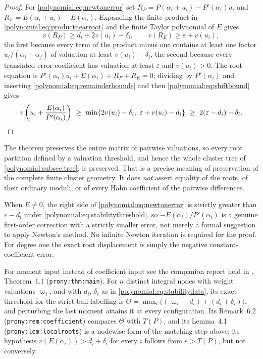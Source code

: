 \documentclass[11pt,letterpaper]{article}
\numberwithin{equation}{section}
\theoremstyle{definition}
\theoremstyle{remark}\newtheorem{remark}[theorem]{Remark}
\begin{document}
\begin{proof}
For \eqref{polynomial:eq:newtonerror} set
$R_P=P(\alpha_i+u_i)-P'(\alpha_i)u_i$ and $R_E=E(\alpha_i+u_i)-E(\alpha_i)$.
Expanding the finite product in \eqref{polynomial:eq:productnearroot} and the
finite Taylor polynomial of $E$ gives
\begin{equation}\label{polynomial:eq:remainderbounds}
 v(R_P)\ge d_i+2v(u_i)-\delta_i,\qquad v(R_E)\ge\varepsilon+v(u_i),
\end{equation}
the first because every term of the product minus one contains at least one
factor $u_i/(\alpha_i-\alpha_j)$ of valuation at least $v(u_i)-\delta_i$, the
second because every translated error coefficient has valuation at least
$\varepsilon$ and $v(u_i)>0$. The root equation is
$P'(\alpha_i)u_i+E(\alpha_i)+R_P+R_E=0$; dividing by $P'(\alpha_i)$ and
inserting \eqref{polynomial:eq:remainderbounds} and then
\eqref{polynomial:eq:shiftbound} gives
\[
 v\left(u_i+\frac{E(\alpha_i)}{P'(\alpha_i)}\right)
 \ \ge\ \min\{2v(u_i)-\delta_i,\ \varepsilon+v(u_i)-d_i\}
 \ \ge\ 2(\varepsilon-d_i)-\delta_i . \qedhere
\]
\end{proof}

The theorem preserves the entire matrix of pairwise valuations, so every root
partition defined by a valuation threshold, and hence the whole cluster tree
of \cref{polynomial:subsec:tree}, is preserved. That is a precise meaning of
preservation of the complete finite cluster geometry. It does \emph{not}
assert equality of the roots, of their ordinary moduli, or of every Hahn
coefficient of the pairwise differences.

When $E\ne0$, the right side of \eqref{polynomial:eq:newtonerror} is strictly greater than
$\varepsilon-d_i$ under \eqref{polynomial:eq:stabilitythreshold}, so
$-E(\alpha_i)/P'(\alpha_i)$ is a genuine first-order correction with a
strictly smaller error, not merely a formal suggestion to apply Newton's
method. No infinite Newton iteration is required for the proof. For degree one
the exact root displacement is simply the negative constant-coefficient error.

For moment input instead of coefficient input see the companion report held in
, Theorem~1.1
(\texttt{prony:thm:main}). For $n$ distinct integral nodes with weight
valuations $\varpi_i$, and with $d_i$, $\delta_i$ as in
\eqref{polynomial:eq:stabilitydata}, its exact threshold for the strict-ball
labelling is $\Theta=\max_i\bigl((\varpi_i+d_i)+(d_i+\delta_i)\bigr)$, and
perturbing the last moment attains it at every configuration. Its Remark~6.2
(\texttt{prony:rem:coefficient}) compares $\Theta$ with $T(P)$, and its
Lemma~4.1 (\texttt{prony:lem:localroots}) is a nodewise form of the matching
step above: its hypothesis $v(E(\alpha_i))>d_i+\delta_i$ for every $i$ follows
from $\varepsilon>T(P)$, but not conversely.
\end{document}

